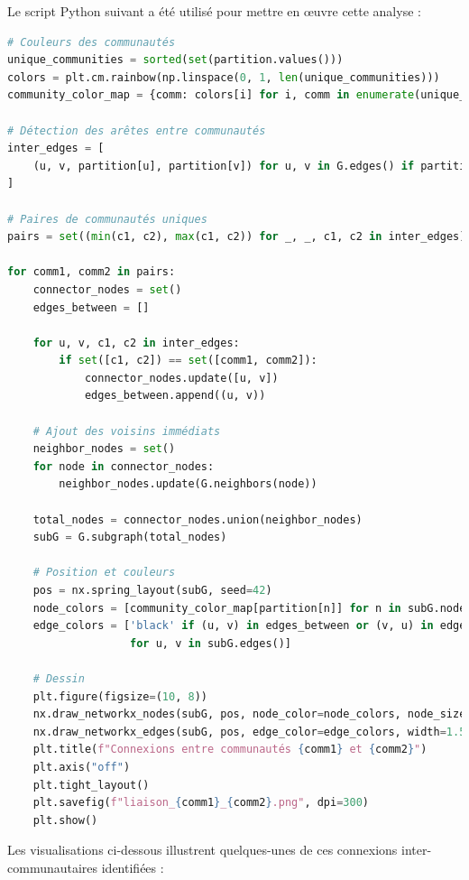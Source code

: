\documentclass[a4paper, 12pt, twoside]{article}
\begin{document}
\vspace{1em}
Le script Python suivant a été utilisé pour mettre en œuvre cette analyse :

\begin{lstlisting}[language=Python, caption={Identification des connexions inter-communautés}, label={lst:intercomm}, frame=single, basicstyle=\ttfamily\small]
# Couleurs des communautés
unique_communities = sorted(set(partition.values()))
colors = plt.cm.rainbow(np.linspace(0, 1, len(unique_communities)))
community_color_map = {comm: colors[i] for i, comm in enumerate(unique_communities)}

# Détection des arêtes entre communautés
inter_edges = [
    (u, v, partition[u], partition[v]) for u, v in G.edges() if partition[u] != partition[v]
]

# Paires de communautés uniques
pairs = set((min(c1, c2), max(c1, c2)) for _, _, c1, c2 in inter_edges)

for comm1, comm2 in pairs:
    connector_nodes = set()
    edges_between = []

    for u, v, c1, c2 in inter_edges:
        if set([c1, c2]) == set([comm1, comm2]):
            connector_nodes.update([u, v])
            edges_between.append((u, v))

    # Ajout des voisins immédiats
    neighbor_nodes = set()
    for node in connector_nodes:
        neighbor_nodes.update(G.neighbors(node))

    total_nodes = connector_nodes.union(neighbor_nodes)
    subG = G.subgraph(total_nodes)

    # Position et couleurs
    pos = nx.spring_layout(subG, seed=42)
    node_colors = [community_color_map[partition[n]] for n in subG.nodes()]
    edge_colors = ['black' if (u, v) in edges_between or (v, u) in edges_between else 'gray'
                   for u, v in subG.edges()]

    # Dessin
    plt.figure(figsize=(10, 8))
    nx.draw_networkx_nodes(subG, pos, node_color=node_colors, node_size=100)
    nx.draw_networkx_edges(subG, pos, edge_color=edge_colors, width=1.5)
    plt.title(f"Connexions entre communautés {comm1} et {comm2}")
    plt.axis("off")
    plt.tight_layout()
    plt.savefig(f"liaison_{comm1}_{comm2}.png", dpi=300)
    plt.show()
\end{lstlisting}

\vspace{1em}
Les visualisations ci-dessous illustrent quelques-unes de ces connexions inter-communautaires identifiées :
\end{document}
